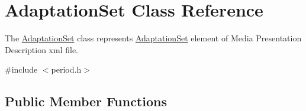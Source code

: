 \hypertarget{class_adaptation_set}{\section{Adaptation\-Set Class Reference}
\label{class_adaptation_set}
}


The \hyperlink{class_adaptation_set}{Adaptation\-Set} class represents \hyperlink{class_adaptation_set}{Adaptation\-Set} element of Media Presentation Description xml file.  




{\ttfamily \#include $<$period.\-h$>$}

\subsection*{Public Member Functions}
